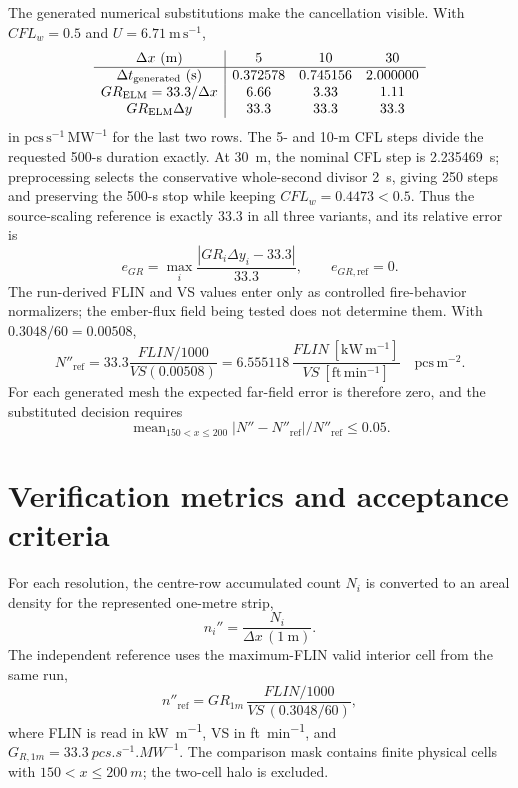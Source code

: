 The generated numerical substitutions make the cancellation visible.  With
\(CFL_w=0.5\) and \(U=6.71~\mathrm{m\,s^{-1}}\),
\[
\begin{array}{c|ccc}
\Delta x~(\mathrm{m})&5&10&30\\\hline
\Delta t_{\rm generated}~(\mathrm{s})&0.372578&0.745156&2.000000\\
GR_{\mathrm{ELM}}=33.3/\Delta x&6.66&3.33&1.11\\
GR_{\mathrm{ELM}}\Delta y&33.3&33.3&33.3
\end{array}
\]
in \(\mathrm{pcs\,s^{-1}\,MW^{-1}}\) for the last two rows. The 5- and 10-m CFL steps divide the requested 500-s duration exactly. At 30~m, the nominal CFL step is 2.235469~s; preprocessing selects the conservative whole-second divisor 2~s, giving 250 steps and preserving the 500-s stop while keeping \(CFL_w=0.4473<0.5\). Thus the
source-scaling reference is exactly 33.3 in all three variants, and its
relative error is
\[
 e_{GR}=\max_i\frac{|GR_i\Delta y_i-33.3|}{33.3},
 \qquad e_{GR,\mathrm{ref}}=0.
\]
The run-derived FLIN and VS values enter only as controlled fire-behavior
normalizers; the ember-flux field being tested does not determine them.  With
\(0.3048/60=0.00508\),
\[
 N''_{\mathrm{ref}}
 =33.3\frac{FLIN/1000}{VS(0.00508)}
 =6.555118\,\frac{FLIN~[\mathrm{kW\,m^{-1}}]}
                   {VS~[\mathrm{ft\,min^{-1}}]}
 \quad\mathrm{pcs\,m^{-2}}.
\]
For each generated mesh the expected far-field error is therefore zero, and
the substituted decision requires
\[\operatorname{mean}_{150<x\leq200}|N''-N''_{\mathrm{ref}}|/
N''_{\mathrm{ref}}\leq0.05.\]

\section{Verification metrics and acceptance criteria}

For each resolution, the centre-row accumulated count \(N_i\) is converted to
an areal density for the represented one-metre strip,
\[
 n_i''=\frac{N_i}{\Delta x\,(1\ \mathrm{m})}.
\]
The independent reference uses the maximum-FLIN valid interior cell from the
same run,
\[
 n''_{\mathrm{ref}}=GR_{1m}\,
 \frac{FLIN/1000}{VS\,(0.3048/60)},
\]
where FLIN is read in \si{kW.m^{-1}}, VS in \si{ft.min^{-1}}, and
\(G_{R,1m}=\SI{33.3}{pcs.s^{-1}.MW^{-1}}\). The comparison mask contains
finite physical cells with \(150<x\le\SI{200}{m}\); the two-cell halo is
excluded.

